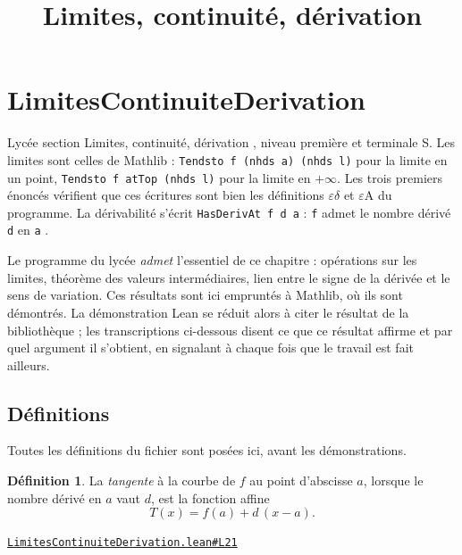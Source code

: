 \documentclass[11pt,a4paper]{article}
\title{Limites, continuité, dérivation}
\date{}
\theoremstyle{definition}
\newtheorem{definition}{Définition}
\theoremstyle{plain}
\newcommand{\source}[2]{\par\smallskip\noindent\hfill{\footnotesize\href{#1}{\texttt{#2}}}\par\smallskip}
\begin{document}
\maketitle
\sloppy

\section{LimitesContinuiteDerivation}

\noindent
Lycée \textemdash{} section \og{} Limites, continuité, dérivation \fg{}, niveau première
et terminale S. Les limites sont celles de Mathlib : \texttt{Tendsto f (nhds a) (nhds l)}
pour la limite en un point, \texttt{Tendsto f atTop (nhds l)} pour la limite en
\(+\infty\). Les trois premiers énoncés vérifient que ces écritures sont bien les
définitions \og{} \(\varepsilon\)\textendash{}\(\delta\) \fg{} et
\og{} \(\varepsilon\)\textendash{}A \fg{} du programme. La dérivabilité s'écrit
\texttt{HasDerivAt f d a} : \og{} \texttt{f} admet le nombre dérivé \texttt{d} en
\texttt{a} \fg{}.

\medskip\noindent
Le programme du lycée \emph{admet} l'essentiel de ce chapitre : opérations sur les
limites, théorème des valeurs intermédiaires, lien entre le signe de la dérivée et le
sens de variation. Ces résultats sont ici empruntés à Mathlib, où ils sont démontrés. La
démonstration Lean se réduit alors à citer le résultat de la bibliothèque ; les
transcriptions ci-dessous disent ce que ce résultat affirme et par quel argument il
s'obtient, en signalant à chaque fois que le travail est fait ailleurs.

\subsection{Définitions}

\noindent
Toutes les définitions du fichier sont posées ici, avant les démonstrations.

\begin{definition}
La \emph{tangente} à la courbe de $f$ au point d'abscisse $a$, lorsque le nombre dérivé
en $a$ vaut $d$, est la fonction affine
\[ T(x) = f(a) + d\,(x - a) . \]
\end{definition}
\source{https://github.com/Commutator-IO/learn-lean/blob/main/courses/02-lycee/04-limites-continuite-derivation/LimitesContinuiteDerivation.lean\#L21}{LimitesContinuiteDerivation.lean\#L21}
\end{document}
